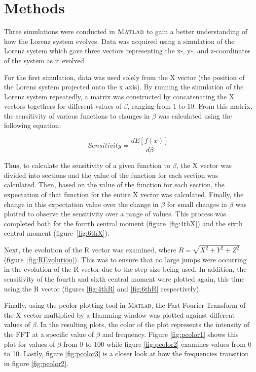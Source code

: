 \documentclass{article}[11pt]
\newcommand{\Matlab}{\textsc{Matlab}}
\begin{document}
\section{Methods}
\label{sec:methods}

Three simulations were conducted in $\Matlab$ to gain a better understanding of how the Lorenz system evolves.  Data was acquired using a simulation of the Lorenz system which gave three vectors representing the x-, y-, and z-coordinates of the system as it evolved. 

For the first simulation, data was used solely from the X vector (the position of the Lorenz system projected onto the x axis). By running the simulation of the Lorenz system repeatedly, a matrix was constructed by concatenating the X vectors togethers for different values of $\beta$, ranging from 1 to 10.  From this matrix, the sensitivity of various functions to changes in $\beta$ was calculated using the following equation:

\begin{equation}
	Sensitivity = \frac{dE[f(x)]}{d\beta}
\end{equation}

\noindent Thus, to calculate the sensitivity of a given function to $\beta$, the X vector was divided into sections and the value of the function for each section was calculated.  Then, based on the value of the function for each section, the expectation of that function for the entire X vector was calculated.  Finally, the change in this expectation value over the change in $\beta$ for small changes in $\beta$ was plotted to observe the sensitivity over a range of values.  This process was completed both for the fourth central moment (figure~\ref{fig:4thX}) and the sixth central moment (figure~\ref{fig:6thX}).

Next, the evolution of the R vector was examined, where $R = \sqrt{X^2 + Y^2 + Z^2}$ (figure~\ref{fig:REvolution}). This was to ensure that no large jumps were occurring in the evolution of the R vector due to the step size being used.  In addition, the sensitivity of the fourth and sixth central moment were plotted again, this time using the R vector (figures \ref{fig:4thR} and \ref{fig:6thR} respectively).

Finally, using the pcolor plotting tool in \Matlab, the Fast Fourier Transform of the X vector multiplied by a Hamming window was plotted against different values of $\beta$.  In the resulting plots, the color of the plot represents the intensity of the FFT at a specific value of $\beta$ and frequency.  Figure \ref{fig:pcolor1} shows this plot for values of $\beta$ from 0 to 100 while figure \ref{fig:pcolor2} examines values from 0 to 10.  Lastly, figure \ref{fig:pcolor3} is a closer look at how the frequencies transition in figure \ref{fig:pcolor2}.
\end{document}
